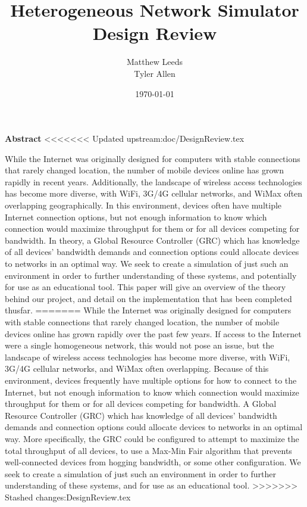 \documentclass[11pt]{article}
\title{Heterogeneous Network Simulator Design Review}
\author{Matthew Leeds\\
	Tyler Allen\\}
\date{\today}
\begin{document}
\maketitle

{\setlength{\parindent}{0cm} \large \textbf{Abstract}}
<<<<<<< Updated upstream:doc/DesignReview.tex

While the Internet was originally designed for computers with stable connections 
that rarely changed location, the number of mobile devices online has grown 
rapidly in recent years. Additionally, the landscape of wireless access 
technologies has become more diverse, with WiFi, 3G/4G cellular networks, and 
WiMax often overlapping geographically. In this environment, devices often have 
multiple Internet connection options, but not enough information to know which 
connection would maximize throughput for them or for all devices competing for 
bandwidth. In theory, a Global Resource Controller (GRC) which has knowledge 
of all devices' bandwidth demands and connection options could allocate devices 
to networks in an optimal way. We seek to create a simulation of just such an 
environment in order to further understanding of these systems, and potentially 
for use as an educational tool. This paper will give an overview of the theory 
behind our project, and detail on the implementation that has been completed 
thusfar.
=======
%
While the Internet was  originally designed 
for computers with stable connections that rarely changed location, the number of mobile devices online has grown 
rapidly over the past few years.  If access to the Internet were a single 
homogeneous network, this would not pose an issue, but the landscape of 
wireless access technologies has become more diverse, with WiFi, 3G/4G 
cellular networks, and WiMax often overlapping.  Because of this environment, 
devices frequently have multiple options for how to connect to the Internet, 
but not enough information to know which connection would maximize throughput 
for them or for all devices competing for bandwidth. A 
Global Resource Controller (GRC) which has knowledge of all devices' 
bandwidth demands and connection options could allocate devices to networks in 
an optimal way. More specifically, the GRC could be configured to attempt to 
maximize the total throughput of all devices, to use a  Max-Min Fair algorithm 
that prevents well-connected devices from hogging bandwidth, or some other 
configuration. We seek to create a simulation of just such an environment in 
order to further understanding of these systems, and for use as an 
educational tool.
>>>>>>> Stashed changes:DesignReview.tex
\end{document}
